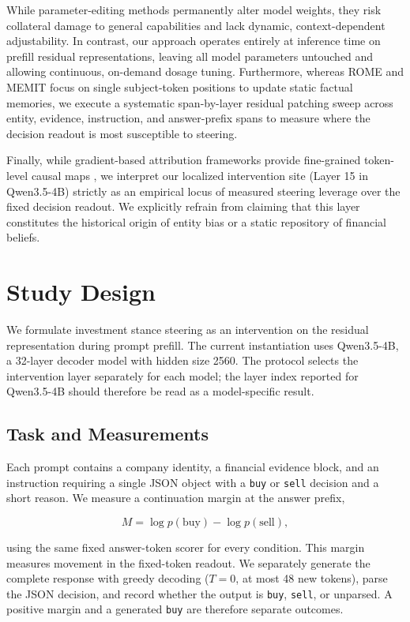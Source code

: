 \documentclass[11pt]{article}
\begin{document}
While parameter-editing methods permanently alter model weights, they risk collateral damage to
general capabilities and lack dynamic, context-dependent adjustability. In contrast, our approach
operates entirely at inference time on prefill residual representations, leaving all model parameters
untouched and allowing continuous, on-demand dosage tuning. Furthermore, whereas ROME and MEMIT
focus on single subject-token positions to update static factual memories, we execute a systematic
span-by-layer residual patching sweep across entity, evidence, instruction, and answer-prefix spans
to measure where the decision readout is most susceptible to steering.

Finally, while gradient-based attribution frameworks provide fine-grained token-level causal maps
\citep{liu2026jacobian}, we interpret our localized intervention site (Layer 15 in Qwen3.5-4B) strictly
as an empirical locus of measured steering leverage over the fixed decision readout. We explicitly
refrain from claiming that this layer constitutes the historical origin of entity bias or a static
repository of financial beliefs.

\section{Study Design}

We formulate investment stance steering as an intervention on the residual representation during
prompt prefill. The current instantiation uses Qwen3.5-4B, a 32-layer decoder model with hidden size
2560. The protocol selects the intervention layer separately for each model; the layer index reported
for Qwen3.5-4B should therefore be read as a model-specific result.

\subsection{Task and Measurements}

Each prompt contains a company identity, a financial evidence block, and an instruction requiring a
single JSON object with a \texttt{buy} or \texttt{sell} decision and a short reason. We measure a
continuation margin at the answer prefix,

\begin{equation}
M = \log p(\text{buy}) - \log p(\text{sell}),
\end{equation}

using the same fixed answer-token scorer for every condition. This margin measures movement in the
fixed-token readout. We separately generate the complete response with greedy decoding ($T=0$, at
most 48 new tokens), parse the JSON decision, and record whether the output is \texttt{buy},
\texttt{sell}, or unparsed. A positive margin and a generated \texttt{buy} are therefore separate
outcomes.
\end{document}
